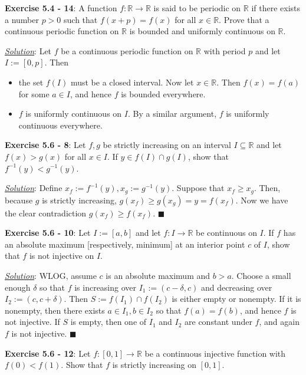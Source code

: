 \documentclass{article}
\begin{document}
\hrulefill

\textbf{Exercise 5.4 - 14}: A function $f: \mathbb R\to\mathbb R$ is said
to be periodic on $\mathbb R$ if there exists a number $p>0$ such that
$f(x+p)=f(x)$ for all $x\in\mathbb R$. Prove that a continuous periodic
function on $\mathbb R$ is bounded and uniformly continuous on $\mathbb R$.

\underline{\textit{Solution}}: Let $f$ be a continuous periodic function on
$\mathbb R$ with period $p$ and let $I:=[0,p]$. Then
\begin{itemize}
  \item the set $f(I)$ must be a closed interval. Now let $x\in\mathbb R$.
    Then $f(x)=f(a)$ for some $a\in I$, and hence $f$ is bounded everywhere.
  \item $f$ is uniformly continuous on $I$. By a similar argument, $f$ is
    uniformly continuous everywhere.
\end{itemize}

\hrulefill

\textbf{Exercise 5.6 - 8}: Let $f,g$ be strictly increasing on an interval
$I\subseteq\mathbb R$ and let $f(x)>g(x)$ for all $x\in I$. If
$y\in f(I)\cap g(I)$, show that $f^{-1}(y)<g^{-1}(y)$.

\underline{\textit{Solution}}: Define $x_f:=f^{-1}(y),x_g:=g^{-1}(y)$.
Suppose that $x_f\geq x_g$.  Then, because $g$ is strictly increasing,
$g(x_f)\geq g(x_g)=y=f(x_f)$. Now we have the clear contradiction
$g(x_f)\geq f(x_f)$.
\hfill $\blacksquare$

\hrulefill

\textbf{Exercise 5.6 - 10}: Let $I:=[a,b]$ and let $f:I\to\mathbb R$ be
continuous on $I$. If $f$ has an absolute maximum [respectively, minimum]
at an interior point $c$ of $I$, show that $f$ is not injective on $I$.

\underline{\textit{Solution}}: WLOG, assume $c$ is an absolute maximum and
$b>a$. Choose a small enough $\delta$ so that $f$ is increasing over
$I_1:=(c-\delta,c)$ and decreasing over $I_2:=(c,c+\delta)$. Then
$S:=f(I_1)\cap f(I_2)$ is either empty or nonempty. If it is nonempty, then
there exists $a\in I_1,b\in I_2$ so that $f(a)=f(b)$, and hence $f$ is not
injective. If $S$ is empty, then one of $I_1$ and $I_2$ are constant under
$f$, and again $f$ is not injective.
\hfill $\blacksquare$

\hrulefill

\textbf{Exercise 5.6 - 12}: Let $f:[0,1]\to\mathbb R$ be a continuous
injective function with $f(0)<f(1)$. Show that $f$ is strictly increasing
on $[0,1]$.
\end{document}
